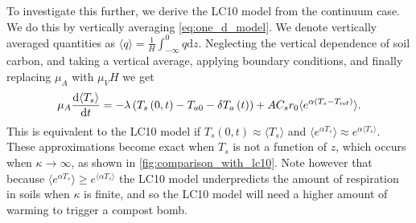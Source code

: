 To investigate this further, we derive  the LC10 model from the continuum case. We do this by vertically averaging \cref{eq:one_d_model}.
We denote vertically averaged quantities as
$\langle q \rangle = \frac{1}{H}\int_{-\infty}^0 q \mathrm{d}z$. Neglecting the vertical dependence of soil carbon, and
taking a vertical average, applying boundary conditions, and finally replacing $\mu_A$ with $\mu_V H$ we get
\begin{equation}
  \label{eq:vertically_averaged}
  \mu_A \dv{\langle T_s \rangle}{t} = -\lambda \left( T_s\left(0,t\right) - T_{a0} - \delta T_a\left(t\right)\right) + AC_sr_0\langle e^{\alpha \left(T_s - T_{\mathrm{ref}}\right)}\rangle.
\end{equation}
This is equivalent to the LC10 model if $T_s(0,t) \approx \langle T_s \rangle$ and $\langle e^{\alpha T_s}\rangle \approx e^{\alpha \langle T_s \rangle}$. These approximations become exact
when $T_s$ is not a function of $z$, which occurs when $\kappa \rightarrow \infty$, as shown in \cref{fig:comparison_with_lc10}.
Note however that because $\langle e^{\alpha T_s} \rangle \ge e^{\langle \alpha T_s \rangle}$ the LC10 model underpredicts the amount of respiration
in soils when $\kappa$ is finite, and so the LC10 model will need a higher amount of warming to trigger a compost bomb.

  
